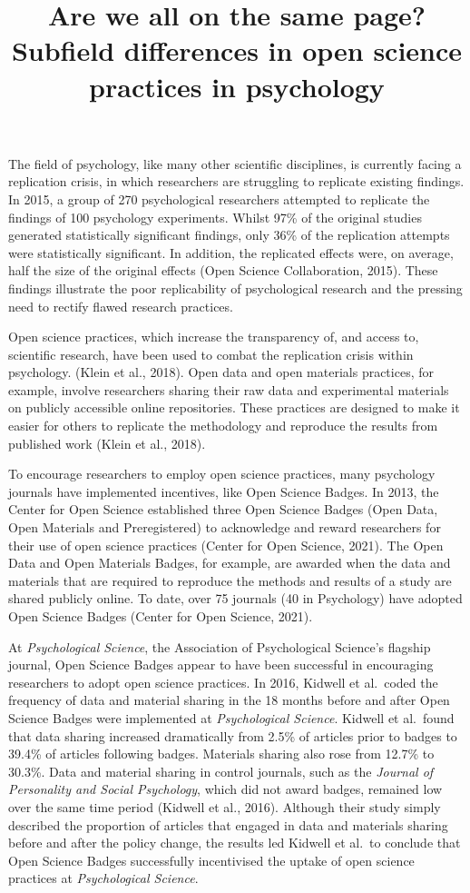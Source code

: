 \documentclass[
  english,
  man,floatsintext]{apa6}
\title{Are we all on the same page? Subfield differences in open science practices in psychology}
\author{\phantom{0}}
\date{}
\affiliation{\phantom{0}}
\begin{document}
\maketitle

The field of psychology, like many other scientific disciplines, is currently facing a replication crisis, in which researchers are struggling to replicate existing findings. In 2015, a group of 270 psychological researchers attempted to replicate the findings of 100 psychology experiments. Whilst 97\% of the original studies generated statistically significant findings, only 36\% of the replication attempts were statistically significant. In addition, the replicated effects were, on average, half the size of the original effects (Open Science Collaboration, 2015). These findings illustrate the poor replicability of psychological research and the pressing need to rectify flawed research practices.

Open science practices, which increase the transparency of, and access to, scientific research, have been used to combat the replication crisis within psychology. (Klein et al., 2018). Open data and open materials practices, for example, involve researchers sharing their raw data and experimental materials on publicly accessible online repositories. These practices are designed to make it easier for others to replicate the methodology and reproduce the results from published work (Klein et al., 2018).

To encourage researchers to employ open science practices, many psychology journals have implemented incentives, like Open Science Badges. In 2013, the Center for Open Science established three Open Science Badges (Open Data, Open Materials and Preregistered) to acknowledge and reward researchers for their use of open science practices (Center for Open Science, 2021). The Open Data and Open Materials Badges, for example, are awarded when the data and materials that are required to reproduce the methods and results of a study are shared publicly online. To date, over 75 journals (40 in Psychology) have adopted Open Science Badges (Center for Open Science, 2021).

At \emph{Psychological Science}, the Association of Psychological Science's flagship journal, Open Science Badges appear to have been successful in encouraging researchers to adopt open science practices. In 2016, Kidwell et al.~coded the frequency of data and material sharing in the 18 months before and after Open Science Badges were implemented at \emph{Psychological Science}. Kidwell et al.~found that data sharing increased dramatically from 2.5\% of articles prior to badges to 39.4\% of articles following badges. Materials sharing also rose from 12.7\% to 30.3\%. Data and material sharing in control journals, such as the \emph{Journal of Personality and Social Psychology}, which did not award badges, remained low over the same time period (Kidwell et al., 2016). Although their study simply described the proportion of articles that engaged in data and materials sharing before and after the policy change, the results led Kidwell et al.~to conclude that Open Science Badges successfully incentivised the uptake of open science practices at \emph{Psychological Science}.
\end{document}
